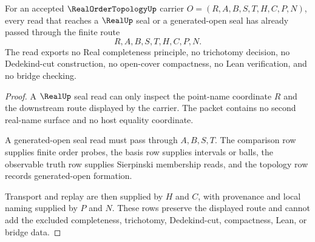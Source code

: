 \begin{theorem}
\label{thm:real-order-topology-real-seal-nonescape}
For an accepted $\RealOrderTopologyUp$ carrier $O=(R,A,B,S,T,H,C,P,N)$, every read that reaches a $\RealUp$ seal or a generated-open seal has already passed through the finite route
$$
R,A,B,S,T,H,C,P,N.
$$
The read exports no Real completeness principle, no trichotomy decision, no Dedekind-cut construction, no open-cover compactness, no Lean verification, and no bridge checking.
\end{theorem}
\begin{proof}
A $\RealUp$ seal read can only inspect the point-name coordinate $R$ and the downstream route displayed by the carrier. The packet contains no second real-name surface and no host equality coordinate.

A generated-open seal read must pass through $A,B,S,T$. The comparison row supplies finite order probes, the basis row supplies intervals or balls, the observable truth row supplies Sierpinski membership reads, and the topology row records generated-open formation.

Transport and replay are then supplied by $H$ and $C$, with provenance and local naming supplied by $P$ and $N$. These rows preserve the displayed route and cannot add the excluded completeness, trichotomy, Dedekind-cut, compactness, Lean, or bridge data.
\end{proof}


\begin{closurestatus}{\RealOrderTopologyUp}
  \theoryclosure{\seedClosure}
  \formalstatus{\unformalizedV}
\end{closurestatus}
